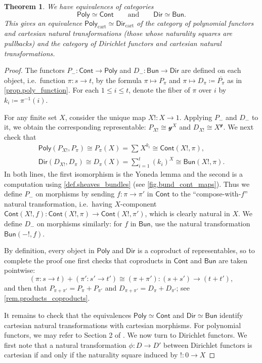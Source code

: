 \documentclass[11pt, article, one side]{memoir}
\theoremstyle{theorem}
\newtheorem{theorem}[section]{Theorem}
\theoremstyle{definition}
\theoremstyle{remark}
\newcommand{\Cat}[1]{\mathsf{#1}}%
\newcommand{\inv}{^{-1}}
\newcommand{\cont}{\Cat{Cont}}
\newcommand{\bun}{\Cat{Bun}}
\newcommand{\yon}{\mathcal{y}}
\newcommand{\poly}{\Cat{Poly}}
\newcommand{\dir}{\Cat{Dir}}
\newcommand{\qqand}{\qquad\text{and}\qquad}
\begin{document}
\begin{theorem}\label{thm.equivs}
We have equivalences of categories
\[
\poly\simeq\cont
\qqand
\dir\simeq\bun.
\]
This gives an equivalence $\poly_{\text{cart}} \simeq \dir_{\text{cart}}$ of the category of polynomial functors and \emph{cartesian} natural transformations (those whose naturality squares are pullbacks) and the category of Dirichlet functors and cartesian natural transformations.
\end{theorem}
\begin{proof}
The functors $P_-\colon\cont\to\poly$ and $D_-\colon\bun\to\dir$ are defined on each object, i.e.\ function $\pi\colon s\to t$, by the formula $\pi\mapsto P_\pi$ and $\pi\mapsto D_\pi\coloneqq\overline{P_\pi}$ as in \cref{prop.poly_function}. For each $1\leq i\leq t$, denote the fiber of $\pi$ over $i$ by $k_i\coloneqq\pi\inv(i)$.

For any finite set $X$, consider the unique map $X!\colon X\to 1$. Applying $P_-$ and $D_-$ to it, we obtain the corresponding representable: $P_{X!}\cong\yon^X$ and $D_{X!}\cong X^\yon$. We next check that
 \begin{gather*}
  \poly(P_{X!},P_\pi)\cong 
  P_\pi(X)=
  \sum_{}X^{k_i}\cong
  \cont(X!, \pi),
  \\
  \dir(D_{X!}, D_\pi)\cong 
  D_\pi(X)=
  \sum_{i=1}^{t}(k_i)^X\cong
  \bun(X!, \pi).
\end{gather*}
In both lines, the first isomorphism is the Yoneda lemma and the second is a computation using \cref{def.sheaves_bundles} (see \cref{fig.bund_cont_maps}). Thus we define $P_-$ on morphisms by sending $f\colon\pi\to\pi'$ in $\cont$ to the ``compose-with-$f$'' natural transformation, i.e.\ having $X$-component $\cont(X!,f)\colon\cont(X!,\pi)\to\cont(X!,\pi')$, which is clearly natural in $X$. We define $D_-$ on morphisms similarly: for $f$ in $\bun$, use the natural transformation $\bun(-!,f)$.

By definition, every object in $\poly$ and $\dir$ is a coproduct of representables, so to complete the proof one first checks that coproducts in $\cont$ and $\bun$ are taken pointwise:
\[
(\pi\colon s\to t)+(\pi'\colon s'\to t')\cong(\pi+\pi')\colon (s+s')\to (t+t'),
\]
and then that $P_{\pi+\pi'}=P_\pi+P_{\pi'}$ and $D_{\pi+\pi'}=D_\pi+D_{\pi'}$; see \cref{rem.products_coproducts}.

It remains to check that the equivalences $\poly \simeq \cont$ and $\dir \simeq \bun$ identify cartesian natural transformations with cartesian morphisms. For polynomial functors, we may refer to Section 2 of \cite{GK:Polynomial.Functors}. We now turn to Dirichlet functors. We first note that a natural transformation $\phi : D \to D'$ between Dirichlet functors is cartesian if and only if the naturality square induced by $! : 0 \to X$


\end{proof}
\end{document}
